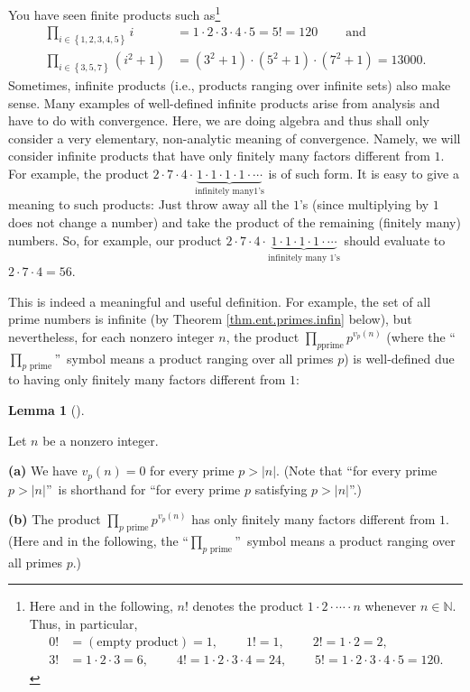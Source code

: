 \documentclass[numbers=enddot,12pt,final,onecolumn,notitlepage]{scrartcl}%
\numberwithin{exer}{subsection}
\theoremstyle{definition}
\newtheorem{lem}[theo]{Lemma}
\newenvironment{lemma}[1][]
{\begin{lem}[#1]\begin{leftbar}}
{\end{leftbar}\end{lem}}
\let\prodnonlimits\prod
\renewcommand{\prod}{\prodnonlimits\limits}
\begin{document}
You have seen finite products such as\footnote{Here and in the following, $n!$
denotes the product $1\cdot2\cdot\cdots\cdot n$ whenever $n\in\mathbb{N}$.
Thus, in particular,
\begin{align*}
0!  &  =\left(  \text{empty product}\right)
=1,\ \ \ \ \ \ \ \ \ \ 1!=1,\ \ \ \ \ \ \ \ \ \ 2!=1\cdot2=2,\\
3!  &  =1\cdot2\cdot3=6,\ \ \ \ \ \ \ \ \ \ 4!=1\cdot2\cdot3\cdot
4=24,\ \ \ \ \ \ \ \ \ \ 5!=1\cdot2\cdot3\cdot4\cdot5=120.
\end{align*}
}
\begin{align*}
\prod_{i\in\left\{  1,2,3,4,5\right\}  }i  &  =1\cdot2\cdot3\cdot
4\cdot5=5!=120\ \ \ \ \ \ \ \ \ \ \text{and}\\
\prod_{i\in\left\{  3,5,7\right\}  }\left(  i^{2}+1\right)   &  =\left(
3^{2}+1\right)  \cdot\left(  5^{2}+1\right)  \cdot\left(  7^{2}+1\right)
=13000.
\end{align*}
Sometimes, infinite products (i.e., products ranging over infinite sets) also
make sense. Many examples of well-defined infinite products arise from
analysis and have to do with convergence. Here, we are doing algebra and thus
shall only consider a very elementary, non-analytic meaning of convergence.
Namely, we will consider infinite products that have only finitely many
factors different from $1$. For example, the product $2\cdot7\cdot
4\cdot\underbrace{1\cdot1\cdot1\cdot1\cdot\cdots}_{\text{infinitely many
}1\text{'s}}$ is of such form. It is easy to give a meaning to such products:
Just throw away all the $1$'s (since multiplying by $1$ does not change a
number) and take the product of the remaining (finitely many) numbers. So, for
example, our product $2\cdot7\cdot4\cdot\underbrace{1\cdot1\cdot1\cdot
1\cdot\cdots}_{\text{infinitely many }1\text{'s}}$ should evaluate to
$2\cdot7\cdot4=56$.

This is indeed a meaningful and useful definition. For example, the set of all
prime numbers is infinite (by Theorem \ref{thm.ent.primes.infin} below), but
nevertheless, for each nonzero integer $n$, the product $\prod_{p\text{
prime}}p^{v_{p}\left(  n\right)  }$ (where the \textquotedblleft%
$\prod_{p\text{ prime}}$\textquotedblright\ symbol means a product ranging
over all primes $p$) is well-defined due to having only finitely many factors
different from $1$:

\begin{lemma}
\label{lem.ent.primes.vpn=0}Let $n$ be a nonzero integer.

\textbf{(a)} We have $v_{p}\left(  n\right)  =0$ for every prime $p>\left\vert
n\right\vert $. (Note that \textquotedblleft for every prime $p>\left\vert
n\right\vert $\textquotedblright\ is shorthand for \textquotedblleft for every
prime $p$ satisfying $p>\left\vert n\right\vert $\textquotedblright.)

\textbf{(b)} The product $\prod_{p\text{ prime}}p^{v_{p}\left(  n\right)  }$
has only finitely many factors different from $1$. (Here and in the following,
the \textquotedblleft$\prod_{p\text{ prime}}$\textquotedblright\ symbol means
a product ranging over all primes $p$.)
\end{lemma}
\end{document}
